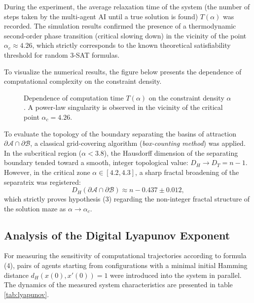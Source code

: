 \documentclass[12pt,a4paper]{article}
\begin{document}
During the experiment, the average relaxation time of the system (the number of steps taken by the multi-agent AI until a true solution is found) $T(\alpha)$ was recorded. The simulation results confirmed the presence of a thermodynamic second-order phase transition (critical slowing down) in the vicinity of the point $\alpha_c \approx 4.26$, which strictly corresponds to the known theoretical satisfiability threshold for random 3-SAT formulas.

To visualize the numerical results, the figure below presents the dependence of computational complexity on the constraint density.

\begin{figure}[htbp]
\centering

\caption{Dependence of computation time $T(\alpha)$ on the constraint density $\alpha$. A power-law singularity is observed in the vicinity of the critical point $\alpha_c = 4.26$.}
\label{fig:singularity}
\end{figure}

To evaluate the topology of the boundary separating the basins of attraction $\partial\mathcal{A} \cap \partial\mathcal{B}$, a classical grid-covering algorithm (\textit{box-counting method}) was applied. In the subcritical region ($\alpha < 3.8$), the Hausdorff dimension of the separating boundary tended toward a smooth, integer topological value: $D_H \to D_T = n - 1$. However, in the critical zone $\alpha \in [4.2, 4.3]$, a sharp fractal broadening of the separatrix was registered:
\begin{equation}
D_H(\partial\mathcal{A} \cap \partial\mathcal{B}) \approx n - 0.437 \pm 0.012,
\end{equation}
which strictly proves hypothesis (3) regarding the non-integer fractal structure of the solution maze as $\alpha \to \alpha_c$.

\subsection{Analysis of the Digital Lyapunov Exponent}

For measuring the sensitivity of computational trajectories according to formula (4), pairs of agents starting from configurations with a minimal initial Hamming distance $d_H(x(0), x'(0)) = 1$ were introduced into the system in parallel. The dynamics of the measured system characteristics are presented in table \ref{tab:lyapunov}.
\end{document}
